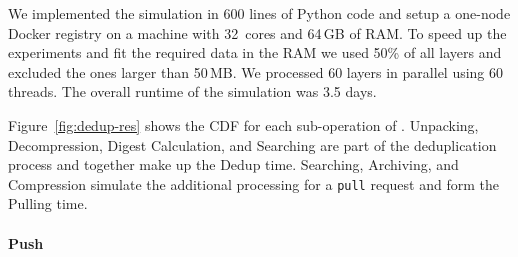 We implemented the simulation in 600 lines of Python code
and setup a one-node Docker registry on a machine with 32~cores and 64\,GB of RAM.
%
To speed up the experiments and fit the required data in the RAM
we used 50\% of all layers and excluded the ones larger than 50\,MB.
%
We processed 60 layers in parallel using 60 threads.
%
The overall runtime of the simulation was 3.5 days.
%

Figure~\ref{fig:dedup-res} shows the CDF for each sub-operation of
\sysname.
%
Unpacking, Decompression, Digest Calculation, and Searching 
are part of
the deduplication process and together make up the Dedup time.
%
%
Searching, Archiving, and Compression
simulate the additional processing for a \texttt{pull}
request and form the Pulling time.
%

%
%
%
%

\paragraph{Push}

